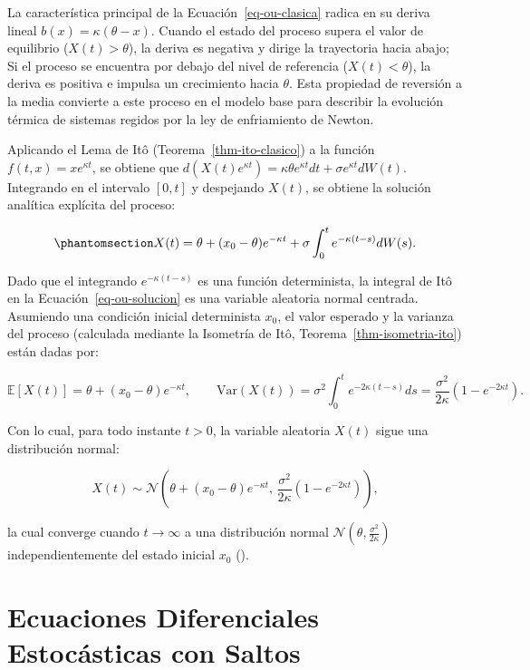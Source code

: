 \documentclass[
  spanish,
  letterpaper,
  DIV=11,
  numbers=noendperiod]{scrreprt}
\theoremstyle{plain}
\theoremstyle{plain}
\theoremstyle{plain}
\theoremstyle{definition}
\theoremstyle{remark}
\begin{document}
La característica principal de la Ecuación~\ref{eq-ou-clasica} radica en
su deriva lineal \(b(x) = \kappa(\theta - x)\). Cuando el estado del
proceso supera el valor de equilibrio (\(X(t) > \theta\)), la deriva es
negativa y dirige la trayectoria hacia abajo; Si el proceso se encuentra
por debajo del nivel de referencia (\(X(t) < \theta\)), la deriva es
positiva e impulsa un crecimiento hacia \(\theta\). Esta propiedad de
reversión a la media convierte a este proceso en el modelo base para
describir la evolución térmica de sistemas regidos por la ley de
enfriamiento de Newton.

Aplicando el Lema de Itô (Teorema~\ref{thm-ito-clasico}) a la función
\(f(t, x) = x e^{\kappa t}\), se obtiene que
\(d(X(t)e^{\kappa t}) = \kappa \theta e^{\kappa t} dt + \sigma e^{\kappa t} dW(t)\).
Integrando en el intervalo \([0, t]\) y despejando \(X(t)\), se obtiene
la solución analítica explícita del proceso:

\begin{equation}\phantomsection\label{eq-ou-solucion}{
X(t) = \theta + (x_0 - \theta)e^{-\kappa t} + \sigma \int_0^t e^{-\kappa(t-s)} dW(s).
}\end{equation}

Dado que el integrando \(e^{-\kappa(t-s)}\) es una función determinista,
la integral de Itô en la Ecuación~\ref{eq-ou-solucion} es una variable
aleatoria normal centrada. Asumiendo una condición inicial determinista
\(x_0\), el valor esperado y la varianza del proceso (calculada mediante
la Isometría de Itô, Teorema~\ref{thm-isometria-ito}) están dadas por:

\[
\mathbb{E}[X(t)] = \theta + (x_0 - \theta)e^{-\kappa t}, \qquad \text{Var}(X(t)) = \sigma^2 \int_0^t e^{-2\kappa(t-s)} ds = \frac{\sigma^2}{2\kappa}\left(1 - e^{-2\kappa t}\right).
\]

Con lo cual, para todo instante \(t > 0\), la variable aleatoria
\(X(t)\) sigue una distribución normal:

\[
X(t) \sim \mathcal{N}\left( \theta + (x_0 - \theta)e^{-\kappa t}, \, \frac{\sigma^2}{2\kappa}\left(1 - e^{-2\kappa t}\right) \right),
\]

la cual converge cuando \(t \to \infty\) a una distribución normal
\(\mathcal{N}\left(\theta, \frac{\sigma^2}{2\kappa}\right)\)
independientemente del estado inicial \(x_0\)
().

\section{Ecuaciones Diferenciales Estocásticas con
Saltos}\label{ecuaciones-diferenciales-estocuxe1sticas-con-saltos}
\end{document}
